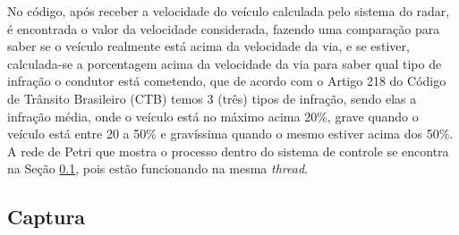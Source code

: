  No código, após receber a velocidade do veículo calculada pelo sistema do radar, é encontrada o valor da velocidade considerada, fazendo uma comparação para saber se o veículo realmente está acima da velocidade da via, e se estiver, calculada-se a porcentagem acima da velocidade da via para saber qual tipo de infração o condutor está cometendo, que de acordo com o Artigo 218 do Código de Trânsito Brasileiro (CTB) \cite{ctb} temos 3 (três) tipos de infração, sendo elas a infração média, onde o veículo está no máximo acima 20\%, grave quando o veículo está entre 20 a 50\% e gravíssima quando o mesmo estiver acima dos 50\%.   
A rede de Petri que mostra o processo dentro do sistema de controle se encontra na Seção \ref{Captura}, pois estão funcionando na mesma \emph{thread}.
    

\subsection{Captura}\label{Captura}
    
